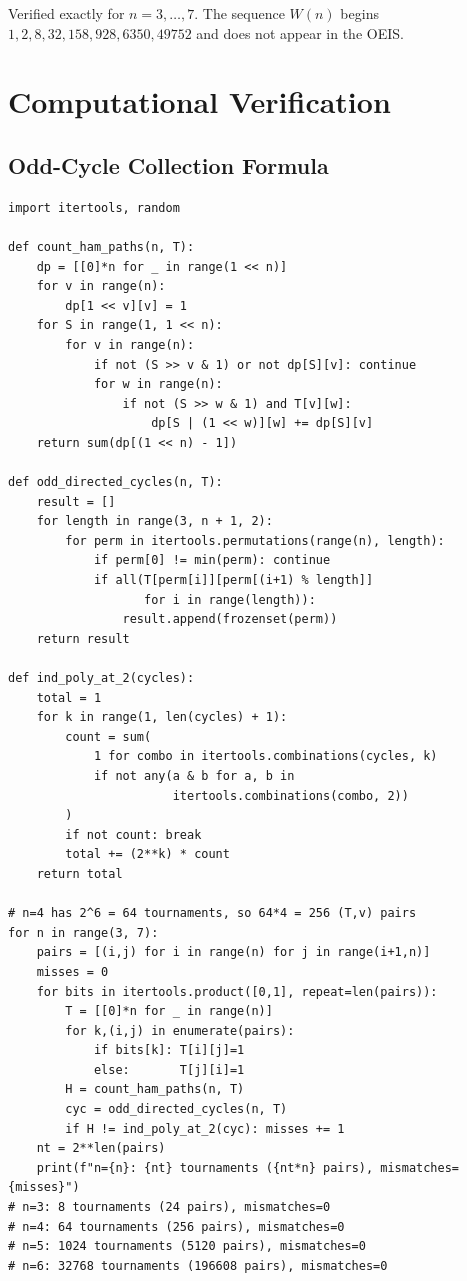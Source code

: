 \documentclass[12pt,reqno]{amsart}
\theoremstyle{plain}
\theoremstyle{definition}
\theoremstyle{remark}
\begin{document}
\noindent Verified exactly for $n = 3, \ldots, 7$.  The sequence $W(n)$ begins $1, 2, 8, 32, 158, 928, 6350, 49752$ and does not appear in the OEIS.

\appendix
\section{Computational Verification}
\label{app:code}

\subsection{Odd-Cycle Collection Formula}

\begin{lstlisting}[caption={OCF verification (Python 3.9+)},label=lst:ocf]
import itertools, random

def count_ham_paths(n, T):
    dp = [[0]*n for _ in range(1 << n)]
    for v in range(n):
        dp[1 << v][v] = 1
    for S in range(1, 1 << n):
        for v in range(n):
            if not (S >> v & 1) or not dp[S][v]: continue
            for w in range(n):
                if not (S >> w & 1) and T[v][w]:
                    dp[S | (1 << w)][w] += dp[S][v]
    return sum(dp[(1 << n) - 1])

def odd_directed_cycles(n, T):
    result = []
    for length in range(3, n + 1, 2):
        for perm in itertools.permutations(range(n), length):
            if perm[0] != min(perm): continue
            if all(T[perm[i]][perm[(i+1) % length]]
                   for i in range(length)):
                result.append(frozenset(perm))
    return result

def ind_poly_at_2(cycles):
    total = 1
    for k in range(1, len(cycles) + 1):
        count = sum(
            1 for combo in itertools.combinations(cycles, k)
            if not any(a & b for a, b in
                       itertools.combinations(combo, 2))
        )
        if not count: break
        total += (2**k) * count
    return total

# n=4 has 2^6 = 64 tournaments, so 64*4 = 256 (T,v) pairs
for n in range(3, 7):
    pairs = [(i,j) for i in range(n) for j in range(i+1,n)]
    misses = 0
    for bits in itertools.product([0,1], repeat=len(pairs)):
        T = [[0]*n for _ in range(n)]
        for k,(i,j) in enumerate(pairs):
            if bits[k]: T[i][j]=1
            else:       T[j][i]=1
        H = count_ham_paths(n, T)
        cyc = odd_directed_cycles(n, T)
        if H != ind_poly_at_2(cyc): misses += 1
    nt = 2**len(pairs)
    print(f"n={n}: {nt} tournaments ({nt*n} pairs), mismatches={misses}")
# n=3: 8 tournaments (24 pairs), mismatches=0
# n=4: 64 tournaments (256 pairs), mismatches=0
# n=5: 1024 tournaments (5120 pairs), mismatches=0
# n=6: 32768 tournaments (196608 pairs), mismatches=0
\end{lstlisting}
\end{document}
